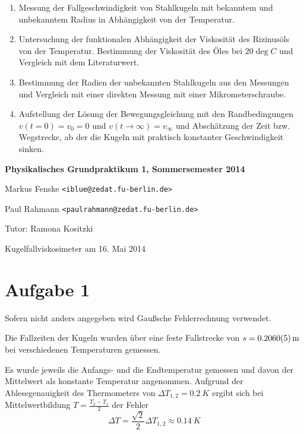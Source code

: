 \documentclass[a4paper,german,12pt,smallheadings]{scrartcl}
\begin{document}
\begin{enumerate}[1.]
  \item Messung der Fallgeschwindigkeit von Stahlkugeln mit bekanntem und
    unbekanntem Radius in Abhängigkeit von der Temperatur.
  \item Untersuchung der funktionalen Abhängigkeit der Viskosität des
    Rizinusöls von der Temperatur. Bestimmung der Viskosität des Öles bei $20
    \deg C$ und Vergleich mit dem Literaturwert.
  \item
    Bestimmung der Radien der unbekannten Stahlkugeln aus den Messungen und
    Vergleich mit einer direkten Messung mit einer Mikrometerschraube.
  \item Aufstellung der Lösung der Bewegungsgleichung mit den Randbedingungen
    $v(t=0) = v_0 = 0$ und $v(t \to \infty) = v_\infty$ und Abschätzung der
    Zeit bzw. Wegstrecke, ab der die Kugeln mit praktisch konstanter
    Geschwindigkeit sinken.
\end{enumerate}

\newpage
\begin{center}
\bfseries %
\sffamily %
\vspace{-40pt}
Physikalisches Grundpraktikum 1, Sommersemester 2014

Markus Fenske \texttt{<iblue@zedat.fu-berlin.de>}

Paul Rahmann \texttt{<paulrahmann@zedat.fu-berlin.de>}

Tutor: Ramona Kositzki

Kugelfallviskosimeter am 16. Mai 2014
\vspace{-10pt}
\end{center}

\section*{Aufgabe 1}
Sofern nicht anders angegeben wird Gaußsche Fehlerrechnung verwendet.


Die Fallzeiten der Kugeln wurden über eine feste Fallstrecke von $s =
\SI{0.2060+-0.0005}{m}$ bei verschiedenen Temperaturen gemessen.

Es wurde jeweils die Anfangs- und die Endtemperatur gemessen und davon der
Mittelwert als konstante Temperatur angenommen. Aufgrund der Ablesegenauigkeit
des Thermometers von $\Delta T_{1,2} = \SI{0.2}{K}$ ergibt sich bei Mittelwertbildung
$T = \frac{T_2 - T_1}{2}$ der Fehler 
\begin{equation}
  \Delta T = \frac{\sqrt{2}}{2} \Delta T_{1,2} \approx \SI{0.14}{K}
\end{equation}
\end{document}
